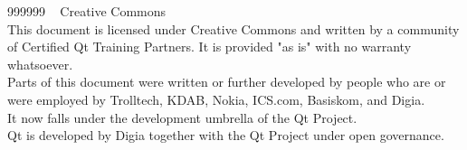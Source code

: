   \begin{slide}{999999}
    \vspace{1em}
    \textcopyright~ Creative Commons\\
    This document is licensed under Creative Commons and written by
    a community of Certified Qt Training Partners. It is provided
    "as is" with no warranty whatsoever. \\
    \vspace{.5em}
    Parts of this document were written or further developed by people
    who are or were employed by Trolltech, KDAB, Nokia, ICS.com,
    Basiskom, and Digia. \\
    \vspace{.5em}
    It now falls under the development umbrella of the Qt Project. \\
    \vspace{.5em}
    Qt is developed by Digia together with the Qt Project under open
    governance.\\
    
  \end{slide}
